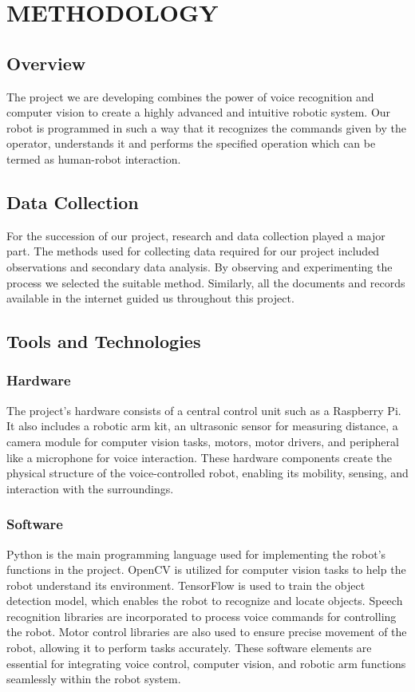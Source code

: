\chapter{METHODOLOGY}
\section{Overview}
The project we are developing combines the power of voice recognition and computer vision to create a highly advanced and intuitive robotic system. Our robot is programmed in such a way that it recognizes the commands given by the operator, understands it and performs the specified operation which can be termed as human-robot interaction.

\section{Data Collection}
For the succession of our project, research and data collection played a major part. The methods used for collecting data required for our project included observations and secondary data analysis. By observing and experimenting the process we selected the suitable method. Similarly, all the documents and records available in the internet guided us throughout this project.
\section{Tools and Technologies}
\subsection{Hardware}
The project's hardware consists of a central control unit such as a Raspberry Pi. It also includes a robotic arm kit, an ultrasonic sensor for measuring distance, a camera module for computer vision tasks, motors, motor drivers, and peripheral like a microphone for voice interaction. These hardware components create the physical structure of the voice-controlled robot, enabling its mobility, sensing, and interaction with the surroundings.
\subsection{Software}
Python is the main programming language used for implementing the robot's functions in the project. OpenCV is utilized for computer vision tasks to help the robot understand its environment. TensorFlow is used to train the object detection model, which enables the robot to recognize and locate objects. Speech recognition libraries are incorporated to process voice commands for controlling the robot. Motor control libraries are also used to ensure precise movement of the robot, allowing it to perform tasks accurately. These software elements are essential for integrating voice control, computer vision, and robotic arm functions seamlessly within the robot system.
